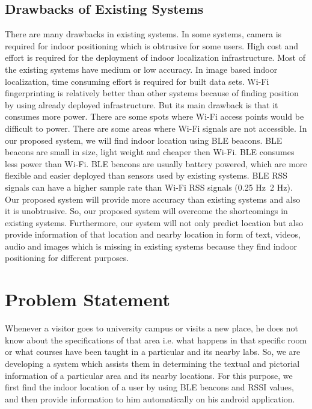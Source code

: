 \documentclass{article}
\begin{document}
\subsection{Drawbacks of Existing Systems}
There are many drawbacks in existing systems. In some systems, camera is required for indoor positioning which is obtrusive for some users. High cost and effort is required for the deployment of indoor localization infrastructure. Most of the existing systems have medium or low accuracy. In image based indoor localization, time consuming effort is required for built data sets. Wi-Fi fingerprinting is relatively better than other systems because of finding position by using already deployed infrastructure. But its main drawback is that it consumes more power. There are some spots where Wi-Fi access points would be difficult to power. There are some areas where Wi-Fi signals are not accessible. In our proposed system, we will find indoor location using BLE beacons. BLE beacons are small in size, light weight and cheaper then Wi-Fi. BLE consumes less power than Wi-Fi. BLE beacons are usually battery powered, which are more flexible and easier deployed than sensors used by existing systems. BLE RSS signals can have a higher sample rate than Wi-Fi RSS signals (0.25 Hz~2 Hz). Our proposed system will provide more accuracy than existing systems and also it is unobtrusive. So, our proposed system will overcome the shortcomings in existing systems. Furthermore, our system will not only predict location but also provide information of that location and nearby location in form of text, videos, audio and images which is missing in existing systems because they find indoor positioning for different purposes.\cite{research4}\\

\section{Problem Statement}
Whenever a visitor goes to university campus or visits a new place, he does not know about the specifications of that area i.e. what happens in that specific room or what courses have been taught in a particular and its nearby labs. So, we are developing a system which assists them in determining the textual and pictorial information of a particular area and its nearby locations. For this purpose, we first find the indoor location of a user by using BLE beacons and RSSI values, and then provide information to him automatically on his android application. 
\end{document}
